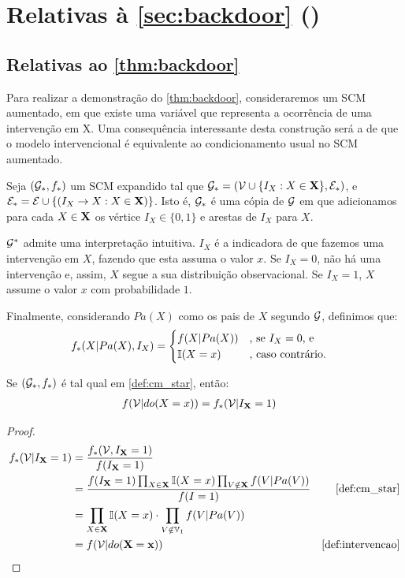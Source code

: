 \section{Relativas à \cref{sec:backdoor} ()}

\subsection{Relativas ao \cref{thm:backdoor}}

Para realizar a demonstração do \cref{thm:backdoor},
consideraremos um SCM aumentado, 
em que existe uma variável que representa
a ocorrência de uma intervenção em X.
Uma consequência interessante desta construção será
a de que o modelo intervencional é equivalente
ao condicionamento usual no SCM aumentado.

\begin{definition}
 \label{def:cm_star}
 Seja $({\mathcal G}_*, f_*)$ um SCM expandido tal que
 ${\mathcal G}_* = ({\mathcal V} \cup \{I_X: X \in {\mathbf{X}}\}, {\mathcal E}_*)$, e
 ${\mathcal E}_* = {\mathcal E} \cup \{(I_X \rightarrow X: X \in {\mathbf{X}})\}$.
 Isto é, ${\mathcal G}_*$ é uma cópia de ${\mathcal G}$ em que
 adicionamos para cada $X \in {\mathbf{X}}$
 os vértice $I_X \in \{0,1\}$ e 
 arestas de $I_X$ para $X$.
 
 ${\mathcal G}^*$ admite uma interpretação intuitiva.
 $I_X$ é a indicadora de que fazemos uma intervenção em $X$,
 fazendo que esta assuma o valor $x$.
 Se $I_X = 0$, não há uma intervenção e, assim,
 $X$ segue a sua distribuição observacional.
 Se $I_X = 1$, $X$ assume o valor $x$ com probabilidade $1$.
 
 Finalmente, considerando $Pa(X)$ como os
 pais de $X$ segundo ${\mathcal G}$, definimos que:
 \begin{align*}
  f_*(X|Pa(X), I_X) 
  &= \begin{cases}
   f(X|Pa(X)) & \text{, se $I_X = 0$, e} \\
   {\mathbb I}(X = x) & \text{, caso contrário.}
  \end{cases}
 \end{align*}
\end{definition}

\begin{lemma}
 \label{lemma:backdoor_1}
 Se $({\mathcal G}_*, f_*)$ é tal qual em \cref{def:cm_star}, então:
 \begin{align*}
  f({\mathcal V}|do(X=x)) &= f_*({\mathcal V}|I_{{\mathbf{X}}}=1)
 \end{align*}
\end{lemma}

\begin{proof}
 \begin{align*}
  f_*(\sV|I_{\X} = 1) 
  &= \frac{f_*(\sV, I_{\X}=1)}{f(I_{\X}=1)} \\
  &= \frac{f(I_{\X}=1)\prod_{X \in \X}\I(X = x)\prod_{V \notin \X}f(V|Pa(V))}{f(I=1)}
  & \text{\cref{def:cm_star}} \\
  &= \prod_{X \in \X}\I(X = x) \cdot \prod_{V \notin \V_1}f(V|Pa(V)) \\
  &= f(\sV|do(\X=\x)) 
  & \text{\cref{def:intervencao}}
 \end{align*}
\end{proof}

